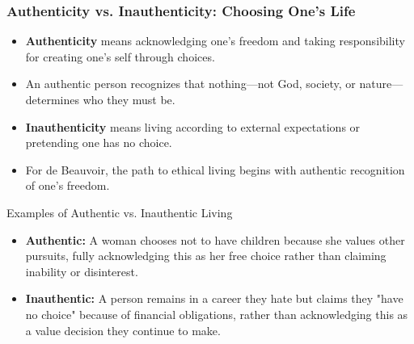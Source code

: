 \documentclass[aspectratio=169]{beamer}
\begin{document}
	\begin{frame}
		\frametitle{Authenticity vs. Inauthenticity: Choosing One's Life}
		\begin{itemize}
			\item \textbf{Authenticity} means acknowledging one's freedom and taking responsibility for creating one's self through choices.
			\item An authentic person recognizes that nothing—not God, society, or nature—determines who they must be.
			\item \textbf{Inauthenticity} means living according to external expectations or pretending one has no choice.
			\item For de Beauvoir, the path to ethical living begins with authentic recognition of one's freedom.
		\end{itemize}
		
		\begin{exampleblock}{Examples of Authentic vs. Inauthentic Living}
			\begin{itemize}
				\item \textbf{Authentic:} A woman chooses not to have children because she values other pursuits, fully acknowledging this as her free choice rather than claiming inability or disinterest.
				\item \textbf{Inauthentic:} A person remains in a career they hate but claims they "have no choice" because of financial obligations, rather than acknowledging this as a value decision they continue to make.
			\end{itemize}
		\end{exampleblock}
	\end{frame}
	
\end{document}

